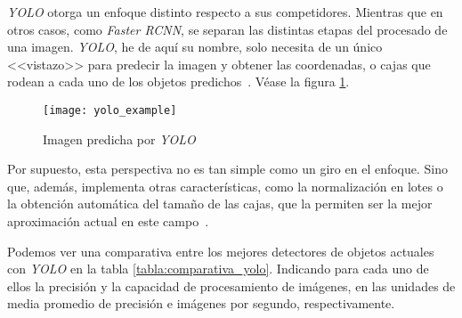\textit{YOLO} otorga un enfoque distinto respecto a sus competidores. Mientras que en otros casos, como \textit{Faster RCNN}, se separan las distintas etapas del procesado de una imagen. \textit{YOLO}, he de aquí su nombre, solo necesita de un único <<vistazo>> para predecir la imagen y obtener las coordenadas, o cajas que rodean a cada uno de los objetos predichos~\cite{yolo}. Véase la figura \ref{fig:3.2.14}.

\begin{figure}[h]
\centering
\texttt{[image: yolo\_example]}
\caption{Imagen predicha por \textit{YOLO}}
\label{fig:3.2.14}
\end{figure}

Por supuesto, esta perspectiva no es tan simple como un giro en el enfoque. Sino que, además, implementa otras características, como la normalización en lotes o la obtención automática del tamaño de las cajas, que la permiten ser la mejor aproximación actual en este campo~\cite{yolov2}.

Podemos ver una comparativa entre los mejores detectores de objetos actuales con \textit{YOLO} en la tabla \ref{tabla:comparativa_yolo}. Indicando para cada uno de ellos la precisión y la capacidad de procesamiento de imágenes, en las unidades de media promedio de precisión e imágenes por segundo, respectivamente.

